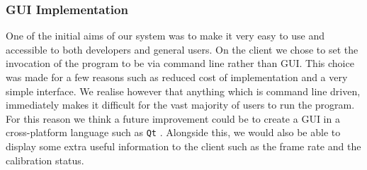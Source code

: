 \documentclass{article}
\begin{document}
\subsubsection{GUI Implementation}
One of the initial aims of our system was to make it very easy to use and accessible to both developers and general users. On the client we chose to set the invocation of the program to be via command line rather than GUI. This choice was made for a few reasons such as reduced cost of implementation and a very simple interface. We realise however that anything which is command line driven, immediately makes it difficult for the vast majority of users to run the program. For this reason we think a future improvement could be to create a GUI in a cross-platform language such as \texttt{Qt} \cite{qt}. Alongside this, we would also be able to display some extra useful information to the client such as the frame rate and the calibration status.
%
\end{document}
